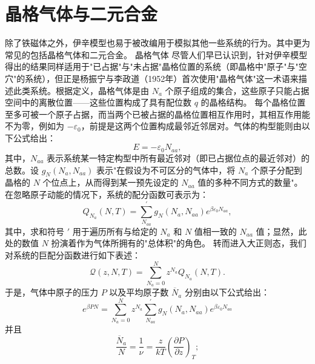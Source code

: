 \section{晶格气体与二元合金}\label{ux6676ux683cux6c14ux4f53ux4e0eux4e8cux5143ux5408ux91d1}
除了铁磁体之外，伊辛模型也易于被改编用于模拟其他一些系统的行为。其中更为常见的包括晶格气体和二元合金。
晶格气体
尽管人们早已认识到，针对伊辛模型得出的结果同样适用于"已占据"与"未占据"晶格位置的系统（即晶格中"原子"与"空穴"的系统），但正是杨振宁与李政道（1952年）首次使用"晶格气体"这一术语来描述此类系统。根据定义，晶格气体是由 \(N_{a}\) 个原子组成的集合，这些原子只能占据空间中的离散位置——这些位置构成了具有配位数 \(q\) 的晶格结构。
每个晶格位置至多可被一个原子占据，而当两个已被占据的晶格位置相互作用时，其相互作用能不为零，例如为 \(-\varepsilon_0\)，前提是这两个位置构成最邻近邻居对。气体的构型能则由以下公式给出：
\begin{equation}\tag{12.4.1}\label{eq:12.4.1}
E = - \varepsilon _ { 0 } N _ { a a } ,
\end{equation}
其中，\(N_{aa}\) 表示系统某一特定构型中所有最近邻对（即已占据位点的最近邻对）的总数。设 \(g_{N}(N_{a},N_{aa})\) 表示"在假设为不可区分的气体中，将 \(N_{a}\) 个原子分配到晶格的 \(N\) 个位点上，从而得到某一预先设定的 \(N_{aa}\) 值的多种不同方式的数量"。在忽略原子动能的情况下，系统的配分函数可表示为：
\begin{equation}\tag{12.4.2}\label{eq:12.4.2}
Q _ { N _ { a } } ( N , T ) = \sum _ { N _ { a a } } ^{\prime} g _ { N } \left( N _ { a } , N _ { a a } \right) e ^{\beta \varepsilon _ { 0} N _ { a a } } ,
\end{equation}
其中，求和符号 \(\prime\) 用于遍历所有与给定的 \(N_{a}\) 和 \(N\) 值相一致的 \(N_{aa}\) 值；显然，此处的数值 \(N\) 扮演着作为气体所拥有的"总体积"的角色。
转而进入大正则态，我们对系统的巨配分函数进行如下表述：
\begin{equation}\tag{12.4.3}\label{eq:12.4.3}
\mathcal { Q } ( z , N , T ) = \sum _ { N _ { a } = 0 } ^{N} z ^{N _ { a} } Q _ { N _ { a } } ( N , T ) .
\end{equation}
于是，气体中原子的压力 \(P\) 以及平均原子数 \(\overline{N}_{a}\) 分别由以下公式给出：
\begin{equation}\tag{12.4.4}\label{eq:12.4.4}
e ^{\beta P N} = \sum _ { N _ { a } = 0 } ^{N} z ^{N _ { a} } \sum _ { N _ { a a } } ^{'} g _ { N } \left( N _ { a } , N _ { a a } \right) e ^{\beta \varepsilon _ { 0} N _ { a a } }
\end{equation}
并且
\begin{equation}\tag{12.4.5}\label{eq:12.4.5}
\frac { \overline { { N } } _ { a } } { N } = \frac { 1 } { \nu } = \frac { z } { k T } \left( \frac { \partial P } { \partial z } \right) _ { T } ;
\end{equation}
